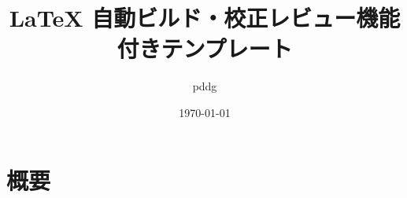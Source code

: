 \documentclass{jsarticle}
\title{ {\LaTeX} 自動ビルド・校正レビュー機能付きテンプレート}
\author{pddg}
\date{\today}
\begin{document}
\maketitle

\section{概要}
\end{document}
